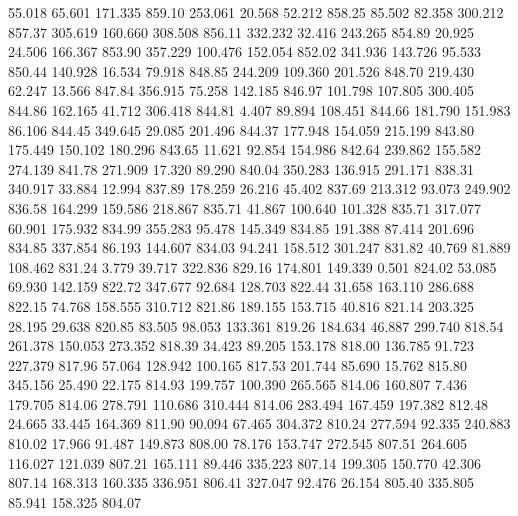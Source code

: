   55.018   65.601  171.335       859.10
 253.061   20.568   52.212       858.25
  85.502   82.358  300.212       857.37
 305.619  160.660  308.508       856.11
 332.232   32.416  243.265       854.89
  20.925   24.506  166.367       853.90
 357.229  100.476  152.054       852.02
 341.936  143.726   95.533       850.44
 140.928   16.534   79.918       848.85
 244.209  109.360  201.526       848.70
 219.430   62.247   13.566       847.84
 356.915   75.258  142.185       846.97
 101.798  107.805  300.405       844.86
 162.165   41.712  306.418       844.81
   4.407   89.894  108.451       844.66
 181.790  151.983   86.106       844.45
 349.645   29.085  201.496       844.37
 177.948  154.059  215.199       843.80
 175.449  150.102  180.296       843.65
  11.621   92.854  154.986       842.64
 239.862  155.582  274.139       841.78
 271.909   17.320   89.290       840.04
 350.283  136.915  291.171       838.31
 340.917   33.884   12.994       837.89
 178.259   26.216   45.402       837.69
 213.312   93.073  249.902       836.58
 164.299  159.586  218.867       835.71
  41.867  100.640  101.328       835.71
 317.077   60.901  175.932       834.99
 355.283   95.478  145.349       834.85
 191.388   87.414  201.696       834.85
 337.854   86.193  144.607       834.03
  94.241  158.512  301.247       831.82
  40.769   81.889  108.462       831.24
   3.779   39.717  322.836       829.16
 174.801  149.339    0.501       824.02
  53.085   69.930  142.159       822.72
 347.677   92.684  128.703       822.44
  31.658  163.110  286.688       822.15
  74.768  158.555  310.712       821.86
 189.155  153.715   40.816       821.14
 203.325   28.195   29.638       820.85
  83.505   98.053  133.361       819.26
 184.634   46.887  299.740       818.54
 261.378  150.053  273.352       818.39
  34.423   89.205  153.178       818.00
 136.785   91.723  227.379       817.96
  57.064  128.942  100.165       817.53
 201.744   85.690   15.762       815.80
 345.156   25.490   22.175       814.93
 199.757  100.390  265.565       814.06
 160.807    7.436  179.705       814.06
 278.791  110.686  310.444       814.06
 283.494  167.459  197.382       812.48
  24.665   33.445  164.369       811.90
  90.094   67.465  304.372       810.24
 277.594   92.335  240.883       810.02
  17.966   91.487  149.873       808.00
  78.176  153.747  272.545       807.51
 264.605  116.027  121.039       807.21
 165.111   89.446  335.223       807.14
 199.305  150.770   42.306       807.14
 168.313  160.335  336.951       806.41
 327.047   92.476   26.154       805.40
 335.805   85.941  158.325       804.07
